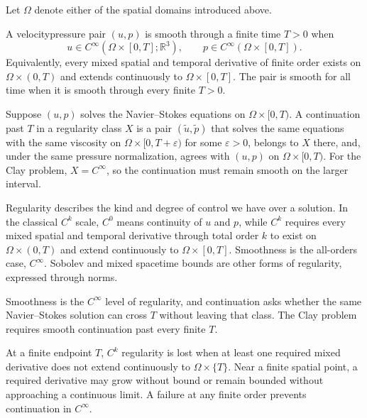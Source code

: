 
Let \(\Omega\) denote either of the spatial domains introduced above.

\begin{definition}[Smoothness]\label{def:Smoothness}
A velocity\textendash pressure pair \((u,p)\) is smooth through a finite time \(T>0\) when
\[
  u\in C^\infty\!\left(\Omega\times[0,T];\mathbb R^3\right),
  \qquad
  p\in C^\infty\!\left(\Omega\times[0,T]\right).
\]
Equivalently, every mixed spatial and temporal derivative of finite order exists on \(\Omega\times(0,T)\) and extends continuously to \(\Omega\times[0,T]\).
The pair is smooth for all time when it is smooth through every finite \(T>0\).
\end{definition}

\begin{definition}[Continuation]\label{def:Continuation}
Suppose \((u,p)\) solves the Navier--Stokes equations on \(\Omega\times[0,T)\).
A continuation past \(T\) in a regularity class \(X\) is a pair \((\widetilde u,\widetilde p)\) that solves the same equations with the same viscosity on \(\Omega\times[0,T+\varepsilon)\) for some \(\varepsilon>0\), belongs to \(X\) there, and, under the same pressure normalization, agrees with \((u,p)\) on \(\Omega\times[0,T)\).
For the Clay problem, \(X=C^\infty\), so the continuation must remain smooth on the larger interval.
\end{definition}

\begin{definition}[Regularity]\label{def:Regularity}
Regularity describes the kind and degree of control we have over a solution.
In the classical \(C^k\) scale, \(C^0\) means continuity of \(u\) and \(p\), while \(C^k\) requires every mixed spatial and temporal derivative through total order \(k\) to exist on \(\Omega\times(0,T)\) and extend continuously to \(\Omega\times[0,T]\).
Smoothness is the all-orders case, \(C^\infty\).
Sobolev and mixed space\textendash time bounds are other forms of regularity, expressed through norms.
\end{definition}

Smoothness is the \(C^\infty\) level of regularity, and continuation asks whether the same Navier--Stokes solution can cross \(T\) without leaving that class.
The Clay problem requires smooth continuation past every finite \(T\).

At a finite endpoint \(T\), \(C^k\) regularity is lost when at least one required mixed derivative does not extend continuously to \(\Omega\times\{T\}\).
Near a finite spatial point, a required derivative may grow without bound or remain bounded without approaching a continuous limit.
A failure at any finite order prevents continuation in \(C^\infty\).
